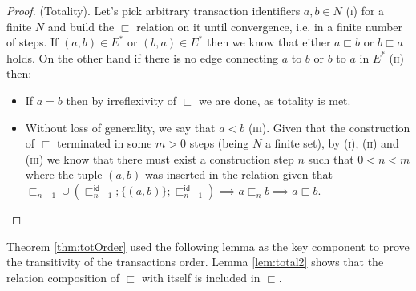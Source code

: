 \begin{thm}
\begin{proof}
	(Totality). Let's pick arbitrary transaction identifiers $a, b \in N$ (\textsc{i}) for a finite $N$ and build the $\sqsubset$ relation on it until convergence, i.e. in a finite number of steps. If $(a, b) \in E^*$ or $(b, a) \in E^*$ then we know that either $a \sqsubset b$ or $b \sqsubset a$ holds. On the other hand if there is no edge connecting $a$ to $b$ or $b$ to $a$ in $E^*$ (\textsc{ii}) then:
	\begin{itemize}
		\item If $a = b$ then by irreflexivity of $\sqsubset$ we are done, as totality is met.
		\item Without loss of generality, we say that $a < b$ (\textsc{iii}). Given that the construction of $\sqsubset$ terminated in some $m > 0$ steps (being $N$ a finite set), by (\textsc{i}), (\textsc{ii}) and (\textsc{iii}) we know that there must exist a construction step $n$ such that $0 < n < m$ where the tuple $(a, b)$ was inserted in the relation given that $\sqsubset_{n-1} \cup \left( \sqsubset_{n-1}^\mathsf{id} ; \{(a,b)\} ; \sqsubset_{n-1}^\mathsf{id} \right) \implies a \sqsubset_n b \implies a \sqsubset b$. 
	\end{itemize}
	\end{proof}
\end{thm}
	
Theorem \ref{thm:totOrder} used the following lemma as the key component to prove the transitivity of the transactions order. Lemma \ref{lem:total2} shows that the relation composition of $\sqsubset$ with itself is included in $\sqsubset$.
	
